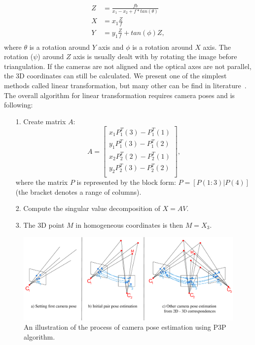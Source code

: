 \begin{equation}
	\begin{aligned}
		Z&=\frac{f b}{x_1 - x_2 + f* tan(\theta)} \\
		X&= x_1 \frac{Z}{f} \\
		Y&= y_1 \frac{Z}{f} + tan(\phi)Z, \\
	\end{aligned}
\end{equation}
where $\theta$ is a rotation around $Y$ axis and $\phi$ is a rotation around $X$ axis. The rotation ($\psi$) around $Z$ axis is usually dealt with by rotating the image before triangulation. If the cameras are not aligned and the optical axes are not parallel, the 3D coordinates can still be calculated. We present one of the simplest methods called linear transformation, but many other can be find in literature~\cite{Hartley96triangulation, book:multiple_view_geometry}. The overall algorithm for linear transformation requires camera poses and is following:
\begin{itemize}
	\item[1.] Create matrix $A$:
	\begin{equation}
		A = 
		\begin{bmatrix}
			x_1 P_1^T(3) - P_1^T(1) \\
			y_1 P_1^T(3) - P_1^T(2) \\
			x_2 P_2^{T}(2) - P_2^{T}(1) \\
			y_2 P_2^{T}(3) - P_2^{T}(2) \\
		\end{bmatrix},
	\end{equation}
	where the matrix $P$ is represented by the block form: $P = [P(1:3)|P(4)]$ (the bracket denotes a range of columns).
	\item[2.] Compute the singular value decomposition of  $X = AV$.
	\item[3.] The 3D point $M$ in homogeneous coordinates is then $M = X_3$.
\end{itemize}

\begin{figure}[ht]
	\begin{center}
		\includegraphics[keepaspectratio,width=\textwidth]{fig/mono.pdf}
	\end{center}
	\caption{An illustration of the process of camera pose estimation using P3P algorithm.\protect\footnotemark}
	\label{fig:mono}
\end{figure}

